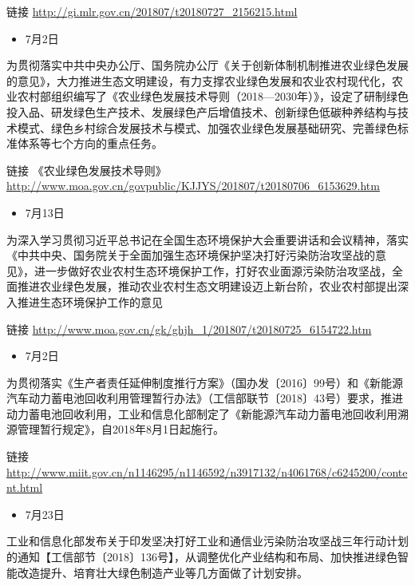 \documentclass[]{book}
\providecommand{\tightlist}{%
  \setlength{\itemsep}{0pt}\setlength{\parskip}{0pt}}
\begin{document}
链接 \url{http://gi.mlr.gov.cn/201807/t20180727_2156215.html}

\begin{itemize}
\tightlist
\item
  7月2日
\end{itemize}

为贯彻落实中共中央办公厅、国务院办公厅《关于创新体制机制推进农业绿色发展的意见》，大力推进生态文明建设，有力支撑农业绿色发展和农业农村现代化，农业农村部组织编写了《农业绿色发展技术导则（2018---2030年）》，设定了研制绿色投入品、研发绿色生产技术、发展绿色产后增值技术、创新绿色低碳种养结构与技术模式、绿色乡村综合发展技术与模式、加强农业绿色发展基础研究、完善绿色标准体系等七个方向的重点任务。

链接
《农业绿色发展技术导则》\url{http://www.moa.gov.cn/govpublic/KJJYS/201807/t20180706_6153629.htm}

\begin{itemize}
\tightlist
\item
  7月13日
\end{itemize}

为深入学习贯彻习近平总书记在全国生态环境保护大会重要讲话和会议精神，落实《中共中央、国务院关于全面加强生态环境保护坚决打好污染防治攻坚战的意见》，进一步做好农业农村生态环境保护工作，打好农业面源污染防治攻坚战，全面推进农业绿色发展，推动农业农村生态文明建设迈上新台阶，农业农村部提出深入推进生态环境保护工作的意见

链接 \url{http://www.moa.gov.cn/gk/ghjh_1/201807/t20180725_6154722.htm}

\begin{itemize}
\tightlist
\item
  7月2日
\end{itemize}

为贯彻落实《生产者责任延伸制度推行方案》（国办发〔2016〕99号）和《新能源汽车动力蓄电池回收利用管理暂行办法》（工信部联节〔2018〕43号）要求，推进动力蓄电池回收利用，工业和信息化部制定了《新能源汽车动力蓄电池回收利用溯源管理暂行规定》，自2018年8月1日起施行。

链接
\url{http://www.miit.gov.cn/n1146295/n1146592/n3917132/n4061768/c6245200/content.html}

\begin{itemize}
\tightlist
\item
  7月23日
\end{itemize}

工业和信息化部发布关于印发坚决打好工业和通信业污染防治攻坚战三年行动计划的通知【工信部节〔2018〕136号】，从调整优化产业结构和布局、加快推进绿色智能改造提升、培育壮大绿色制造产业等几方面做了计划安排。
\end{document}
